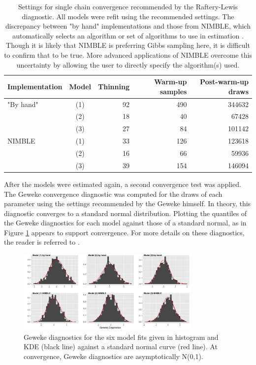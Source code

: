 \documentclass{article}
\begin{document}
\begin{table}[h]
\centering
\caption{Settings for single chain convergence recommended by the Raftery-Lewis diagnostic. All models were refit using the recommended settings. The discrepancy between "by hand" implementations and those from NIMBLE, which automatically selects an algorithm or set of algorithms to use in estimation \citep{beraha2021}. Though it is likely that NIMBLE is preferring Gibbs sampling here, it is difficult to confirm that to be true. More advanced applications of NIMBLE overcome this uncertainty by allowing the user to directly specify the algorithm(s) used.}
\label{tab:raftery-lewis}
\begin{tabular}{l|crrr}
\hline
 Implementation & Model & Thinning & Warm-up samples & Post-warm-up draws \\
          \hline
"By hand" & (1)   & 92       & 490             & 344632             \\
          & (2)   & 18       & 40              & 67428              \\
          & (3)   & 27       & 84              & 101142              \\
          \hline
NIMBLE    & (1)   & 33       & 126             & 123618             \\
          & (2)   & 16       & 66              & 59936              \\
          & (3)   & 39       & 154             & 146094          
\end{tabular}
\end{table}

After the models were estimated again, a second convergence test was applied. The Geweke convergence diagnostic was computed for the draws of each parameter using the settings recommended by the Geweke himself. In theory, this diagnostic converges to a standard normal distribution. Plotting the quantiles of the Geweke diagnostics for each model against those of a standard normal, as in Figure \ref{fig:geweke} appears to support convergence. For more details on these diagnostics, the reader is referred to \cite{cowles1996}.

\begin{figure}[h]
	\centering \includegraphics[width=0.8\textwidth]{SemesterProject/geweke_diags.png}
	\caption{Geweke diagnostics for the six model fits given in histogram and KDE (black line) against a standard normal curve (red line). At convergence, Geweke diagnostics are asymptotically N(0,1). }
	\label{fig:geweke}
\end{figure} 
\end{document}

